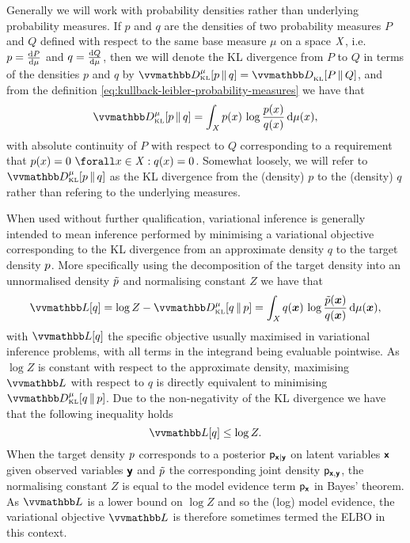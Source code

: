 Generally we will work with probability densities rather than underlying probability measures. If $p$ and $q$ are the densities of two probability measures $P$ and $Q$ defined with respect to the same base measure $\mu$ on a space $\mathit{X}$, i.e. $p = \frac{\mathrm{d} P}{\mathrm{d} \mu}$ and $q = \frac{\mathrm{d} Q}{\mathrm{d} \mu}$, then we will denote the \ac{KL} divergence from $P$ to $Q$ in terms of the densities $p$ and $q$ by $\kldiv[\mu]{p}{q} = \kldiv{P}{Q}$, and from the definition \eqref{eq:kullback-leibler-probability-measures} we have that
\begin{equation}\label{eq:kullback-leibler-probability-densities}
  \kldiv[\mu]{p}{q} =
  \int_{\set{X}} p(x) \, \log\frac{p(x)}{q(x)} \, \dr\mu(x),
\end{equation}
with absolute continuity of $P$ with respect to $Q$ corresponding to a requirement that $p(x) = 0 ~\forall x \in \set{X} : q(x) = 0$. Somewhat loosely, we will refer to $\kldiv[\mu]{p}{q}$ as the \ac{KL} divergence from the (density) $p$ to the (density) $q$ rather than refering to the underlying measures.

When used without further qualification, variational inference is generally intended to mean inference performed by minimising a variational objective corresponding to the \ac{KL} divergence from an approximate density $q$ to the target density $p$. More specifically using the decomposition of the target density into an unnormalised density $\tilde{p}$ and normalising constant $Z$ we have that
\begin{equation}\label{eq:kullback-leibler-var-obj}
  \varobj\lsb q \rsb = \log Z - \kldiv[\mu]{q}{\tgtdens} =
  \int_{\set{X}} q(\vct{x})\,\log \frac{\utgtdens(\vct{x})}{q(\vct{x})} \,\dr\mu(\vct{x}),
\end{equation}
with $\varobj\lsb q \rsb$ the specific objective usually maximised in variational inference problems, with all terms in the integrand being evaluable pointwise. As $\log Z$ is constant with respect to the approximate density, maximising $\varobj$ with respect to $q$ is directly equivalent to minimising $\kldiv[\mu]{q}{\tgtdens}$. Due to the non-negativity of the \ac{KL} divergence we have that the following inequality holds
\begin{equation}\label{eq:evidence-lower-bound}
  \varobj\lsb q \rsb \leq \log Z.
\end{equation}
When the target density $p$ corresponds to a posterior $\mathsf{p}_{\boldsymbol{\mathsf{x}}|\boldsymbol{\mathsf{y}}}$ on latent variables $\boldsymbol{\mathsf{x}}$ given observed variables $\boldsymbol{\mathsf{y}}$ and $\tilde{p}$ the corresponding joint density $\mathsf{p}_{\boldsymbol{\mathsf{x}},\boldsymbol{\mathsf{y}}}$, the normalising constant $Z$ is equal to the model evidence term $\mathsf{p}_{\boldsymbol{\mathsf{x}}}$ in Bayes' theorem. As $\varobj$ is a lower bound on $\log Z$ and so the (log) model evidence, the variational objective $\varobj$ is therefore sometimes termed the \ac{ELBO} in this context.

